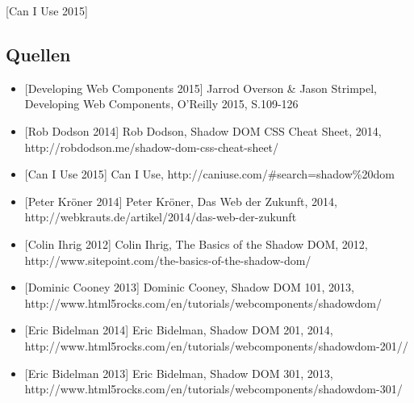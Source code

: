 {[}Can I Use 2015{]}

\subsection{Quellen}\label{quellen}

\begin{itemize}
\tightlist
\item
  {[}Developing Web Components 2015{]} Jarrod Overson \& Jason Strimpel,
  Developing Web Components, O'Reilly 2015, S.109-126
\item
  {[}Rob Dodson 2014{]} Rob Dodson, Shadow DOM CSS Cheat Sheet, 2014,
  http://robdodson.me/shadow-dom-css-cheat-sheet/
\item
  {[}Can I Use 2015{]} Can I Use,
  http://caniuse.com/\#search=shadow\%20dom
\item
  {[}Peter Kröner 2014{]} Peter Kröner, Das Web der Zukunft, 2014,
  http://webkrauts.de/artikel/2014/das-web-der-zukunft
\item
  {[}Colin Ihrig 2012{]} Colin Ihrig, The Basics of the Shadow DOM,
  2012, http://www.sitepoint.com/the-basics-of-the-shadow-dom/
\item
  {[}Dominic Cooney 2013{]} Dominic Cooney, Shadow DOM 101, 2013,
  http://www.html5rocks.com/en/tutorials/webcomponents/shadowdom/
\item
  {[}Eric Bidelman 2014{]} Eric Bidelman, Shadow DOM 201, 2014,
  http://www.html5rocks.com/en/tutorials/webcomponents/shadowdom-201//
\item
  {[}Eric Bidelman 2013{]} Eric Bidelman, Shadow DOM 301, 2013,
  http://www.html5rocks.com/en/tutorials/webcomponents/shadowdom-301/
\end{itemize}
